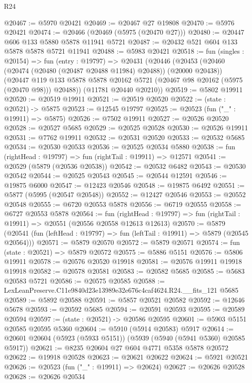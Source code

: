 \begin{lexlean}{R24}
\begin{coremodule}
@20467 := @5970 @20421
@20469 := @20467 @27 @19808
@20470 := @5976 @20421
@20474 := @20466 (@20469 (@5975 (@20470 @27)))
@20480 := @20447 @606 @133 @5880 @5878 @11941 @5721
@20487 := @20432 @521 @604 @133 @5878 @5878 @5721 @11941
@20488 := @5983 @20421
@20518 := fun (singles : @20154) =>
  fun (entry : @19797) =>
  @20431
    (@20446
      (@20453
        (@20460 (@20474 (@20480 (@20487 @20488 @11984) @20488)) (@20000 @20438))
        (@20447 @119 @133 @5878 @5878 @20162 @5721 (@20467 @98 @20162 (@5975 (@20470 @98))) @20488))
      (@11781 @20440 @20210))
@20519 := @5802 @19911
@20520 := @20519 @19911
@20521 := @20519 @20520
@20522 := (state : @20521) -> @5875
@20523 := @12545 @19797
@20525 := @20523 (fun ("_" : @19911) => @5875)
@20526 := @7502 @19911
@20527 := @20526 @20520
@20528 := @20527 @5685
@20529 := @20525 @20528
@20530 := @20526 @19911
@20531 := @7762 @19911
@20532 := @20531 @20520
@20533 := @20532 @5685
@20534 := @20530 @20533
@20536 := @20525 @20534 @5880
@20538 := fun (rightHead : @19797) => fun (rightTail : @19911) => @12571
@20541 := @20529 (@5879 (@20536 @20538))
@20542 := @20532 @6482
@20543 := @20530 @20542
@20544 := @20525 @20543
@20545 := @20544 @12591
@20546 := @19875 @6000
@20547 := @12423 @20546
@20548 := @19875 @6492
@20551 := @5877 (@5995 (@20547 @20548))
@20552 := @12427 @20546
@20553 := @20552 @20548
@20555 := @6720 @20553 @5878
@20556 := @6719 @20555
@20558 := @6727 @20553 @5878
@20564 := fun (rightHead : @19797) =>
  fun (rightTail : @19911) => @20551 (@20556 @20558 @12613 @12613)
@20570 := @5879
    (@20541 (fun (leftHead : @19797) => fun (leftTail : @19911) => @5879 (@20545 @20564)))
@20571 := @5879 @20570
@20572 := @5879 @20571
@20574 := fun (state : @20521) => @5879 @20572
@20575 := @5886 @5151
@20576 := @5806 @19911
@20578 := @20576 @20520 @19918
@20581 := @20576 @19911 @19918 @19918
@20582 := @20578 @20581
@20583 := @20582 @5685
@20585 := @5683 @20583 @5721
@20586 := @20575 @20585
@20588 := LexLeanPreserve.C11e9840d23e13989e32e676c4caf4624.R24.__fits_121 @5685
@20589 := @5892 @20588
@20591 := @5857 @20521 @20582
@20592 := @12646 @5678
@20593 := @20592 @5685
@20594 := @20591 @20593
@20595 := @20589 @20594
@20597 := (state : @20521) -> @20586 @20595
@20601 := @5903 @5151 @20585 @20595 @5360
@20604 := @5910 (@5914 @20583) @5917
@20614 := @20601 @20604 (@5923 (@5933 @5151)) (@5939 (@5940 (@5941 @5360) @20585 @5917))
@20621 := @8235 @20604 @27 @604 @4771 @5358 @5878 @20572
@20622 := @19918 @20528
@20623 := @20621 @20622
@20624 := @5921 @20521
@20626 := @20523 (fun ("_" : @19911) => @20624)
@20627 := @20626 @20528
@20628 := @20626 @20534

\end{coremodule}
\end{lexlean}
